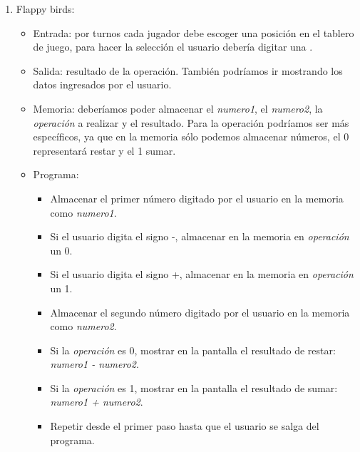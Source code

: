 \begin{Answer}
\begin{enumerate}
\item Flappy birds:
	\begin{itemize}
		\item Entrada: por turnos cada jugador debe escoger una posición en el tablero de juego, para hacer la selección el usuario debería digitar una .
		\item Salida: resultado de la operación. También podríamos ir mostrando los datos ingresados por el usuario.
		\item Memoria: deberíamos poder almacenar el \emph{numero1}, el \emph{numero2}, la \emph{operación} a realizar y el resultado. Para la operación podríamos ser más específicos, ya que en la memoria sólo podemos almacenar números, el 0 representará restar y el 1 sumar.
		\item Programa:
		\begin{itemize}
			\item Almacenar el primer número digitado por el usuario en la memoria como  \emph{numero1}.					
			\item Si el usuario digita el signo -, almacenar en la memoria en \emph{operación} un 0.
			\item Si el usuario digita el signo +, almacenar en la memoria en \emph{operación} un 1.
			\item Almacenar el segundo número digitado por el usuario en la memoria como  \emph{numero2}.
			\item Si la \emph{operación} es 0, mostrar en la pantalla el resultado de restar: \emph{numero1 - numero2}.					
			\item Si la \emph{operación} es 1, mostrar en la pantalla el resultado de sumar: \emph{numero1 + numero2}.
			\item Repetir desde el primer paso hasta que el usuario se salga del programa.
		\end{itemize}
		
	\end{itemize}
\end{enumerate}
\newpage
\end{Answer}

\newpage
